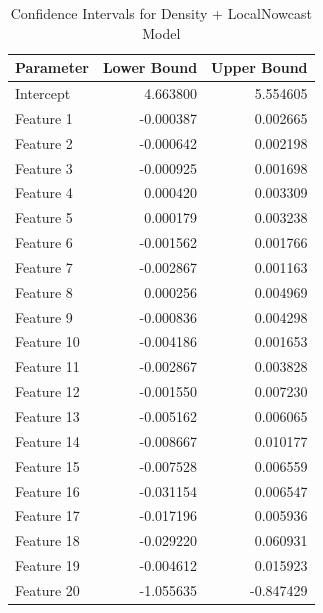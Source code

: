 \begin{table}
\caption{Confidence Intervals for Density + LocalNowcast Model}
\begin{tabular}{lrr}
\toprule
Parameter & Lower Bound & Upper Bound \\
\midrule
Intercept & 4.663800 & 5.554605 \\
Feature 1 & -0.000387 & 0.002665 \\
Feature 2 & -0.000642 & 0.002198 \\
Feature 3 & -0.000925 & 0.001698 \\
Feature 4 & 0.000420 & 0.003309 \\
Feature 5 & 0.000179 & 0.003238 \\
Feature 6 & -0.001562 & 0.001766 \\
Feature 7 & -0.002867 & 0.001163 \\
Feature 8 & 0.000256 & 0.004969 \\
Feature 9 & -0.000836 & 0.004298 \\
Feature 10 & -0.004186 & 0.001653 \\
Feature 11 & -0.002867 & 0.003828 \\
Feature 12 & -0.001550 & 0.007230 \\
Feature 13 & -0.005162 & 0.006065 \\
Feature 14 & -0.008667 & 0.010177 \\
Feature 15 & -0.007528 & 0.006559 \\
Feature 16 & -0.031154 & 0.006547 \\
Feature 17 & -0.017196 & 0.005936 \\
Feature 18 & -0.029220 & 0.060931 \\
Feature 19 & -0.004612 & 0.015923 \\
Feature 20 & -1.055635 & -0.847429 \\
\bottomrule
\end{tabular}
\end{table}
